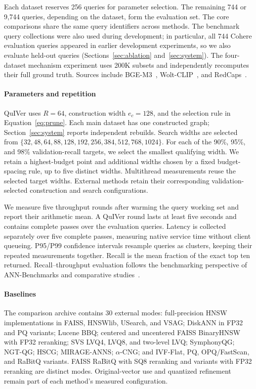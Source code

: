 Each dataset reserves 256 queries for parameter selection. The remaining 744 or 9,744 queries, depending on the dataset, form the evaluation set. The core comparisons share the same query identifiers across methods. The benchmark query collections were also used during development; in particular, all 744 Cohere evaluation queries appeared in earlier development experiments, so we also evaluate held-out queries (Sections~\ref{sec:ablation} and~\ref{sec:system}). The four-dataset mechanism experiment uses 200K subsets and independently recomputes their full ground truth. Sources include BGE-M3~\cite{chen2024bgem3}, Wolt-CLIP~\cite{woltclip2024}, and RedCaps~\cite{desai2021redcaps}.

\paragraph{Parameters and repetition}
QuIVer uses $R=64$, construction width $e_c=128$, and the selection rule in Equation~\eqref{eq:prune}. Each main dataset has one constructed graph; Section~\ref{sec:system} reports independent rebuilds. Search widths are selected from
$\{32,48,64,88,128,192,256,384,512,768,1024\}$.
For each of the 90\%, 95\%, and 98\% validation-recall targets, we select the smallest qualifying width. We retain a highest-budget point and additional widths chosen by a fixed budget-spacing rule, up to five distinct widths. Multithread measurements reuse the selected target widths. External methods retain their corresponding validation-selected construction and search configurations.

We measure five throughput rounds after warming the query working set and report their arithmetic mean. A QuIVer round lasts at least five seconds and contains complete passes over the evaluation queries. Latency is collected separately over five complete passes, measuring native service time without client queueing. P95/P99 confidence intervals resample queries as clusters, keeping their repeated measurements together. Recall is the mean fraction of the exact top ten returned. Recall--throughput evaluation follows the benchmarking perspective of ANN-Benchmarks and comparative studies~\cite{aumuller2020annbenchmarks,aumuller2023trends,li2019annanalysis}.

\paragraph{Baselines}
The comparison archive contains 30 external modes: full-precision HNSW implementations in FAISS, HNSWlib, USearch, and VSAG; DiskANN in FP32 and PQ variants; Lucene BBQ; centered and uncentered FAISS BinaryHNSW with FP32 reranking; SVS LVQ4, LVQ8, and two-level LVQ; SymphonyQG; NGT-QG; HSCG; MIRAGE-ANNS; $\alpha$-CNG; and IVF-Flat, PQ, OPQ/FastScan, and RaBitQ variants. FAISS RaBitQ with SQ8 reranking and variants with FP32 reranking are distinct modes. Original-vector use and quantized refinement remain part of each method's measured configuration.

